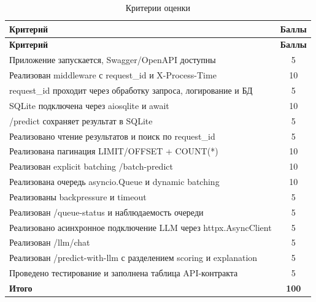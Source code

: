 \documentclass[12pt,a4paper]{article}
\begin{document}
\begin{longtable}{|p{11cm}|c|}
\caption{Критерии оценки}
\label{tab:criteria}\\
\hline
\textbf{Критерий} & \textbf{Баллы} \\
\hline
\endfirsthead
\hline
\textbf{Критерий} & \textbf{Баллы} \\
\hline
\endhead
Приложение запускается, Swagger/OpenAPI доступны & 5 \\
Реализован middleware с request\_id и X-Process-Time & 10 \\
request\_id проходит через обработку запроса, логирование и БД & 5 \\
SQLite подключена через aiosqlite и await & 10 \\
/predict сохраняет результат в SQLite & 5 \\
Реализовано чтение результатов и поиск по request\_id & 5 \\
Реализована пагинация LIMIT/OFFSET + COUNT(*) & 10 \\
Реализован explicit batching /batch-predict & 10 \\
Реализована очередь asyncio.Queue и dynamic batching & 10 \\
Реализованы backpressure и timeout & 5 \\
Реализован /queue-status и наблюдаемость очереди & 5 \\
Реализовано асинхронное подключение LLM через httpx.AsyncClient & 5 \\
Реализован /llm/chat & 5 \\
Реализован /predict-with-llm с разделением scoring и explanation & 5 \\
Проведено тестирование и заполнена таблица API-контракта & 5 \\
\hline
\textbf{Итого} & \textbf{100} \\
\hline
\end{longtable}
\end{document}

